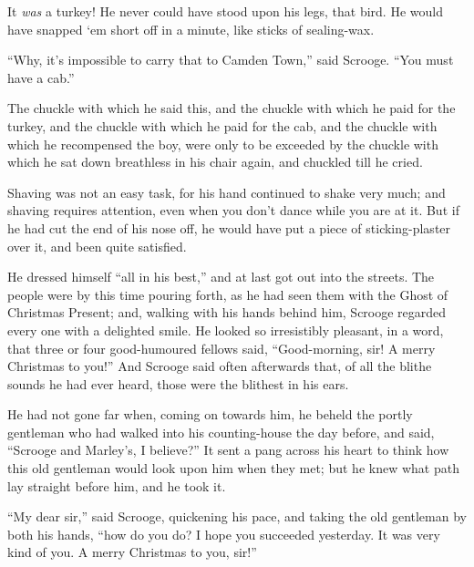 \documentclass[paper=5.5in:8.5in,BCOR=5mm,twoside,DIV=calc,12pt,usegeometry]{scrbook} %
\begin{document}
It \textit{was} a turkey! He never could have stood upon his legs, that bird. He would have snapped `em short off in a minute, like sticks of sealing-wax.

\enquote{Why, it's impossible to carry that to Camden Town,} said Scrooge. \enquote{You must have a cab.}

The chuckle with which he said this, and the chuckle with which he paid for the turkey, and the chuckle with which he paid for the cab, and the chuckle with which he recompensed the boy, were only to be exceeded by the chuckle with which he sat down breathless in his chair again, and chuckled till he cried.

Shaving was not an easy task, for his hand continued to shake very much; and shaving requires attention, even when you don't dance while you are at it. But if he had cut the end of his nose off, he would have put a piece of sticking-plaster over it, and been quite satisfied.

He dressed himself \enquote{all in his best,} and at last got out into the streets. The people were by this time pouring forth, as he had seen them with the Ghost of Christmas Present; and, walking with his hands behind him, Scrooge regarded every one with a delighted smile. He looked so irresistibly pleasant, in a word, that three or four good-humoured fellows said, \enquote{Good-morning, sir! A merry Christmas to you!} And Scrooge said often afterwards that, of all the blithe sounds he had ever heard, those were the blithest in his ears.

He had not gone far when, coming on towards him, he beheld the portly gentleman who had walked into his counting-house the day before, and said, \enquote{Scrooge and Marley's, I believe?} It sent a pang across his heart to think how this old gentleman would look upon him when they met; but he knew what path lay straight before him, and he took it.

\enquote{My dear sir,} said Scrooge, quickening his pace, and taking the old gentleman by both his hands, \enquote{how do you do? I hope you succeeded yesterday. It was very kind of you. A merry Christmas to you, sir!}
\end{document}
